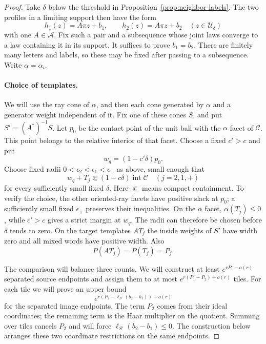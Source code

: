 \begin{proof}
Take $\delta$ below the threshold in Proposition~\ref{prop:neighbor-labels}.
The two profiles in a limiting support then have the form
\[
 h_1(z)=A\pi z+b_1,\qquad h_2(z)=A\pi z+b_2
 \quad(z\in\mathcal U_\delta)
\]
with one $A\in\mathcal A$.  Fix such a pair and a subsequence whose joint
laws converge to a law containing it in its support.  It suffices to prove
$b_1=b_2$.  There are finitely many letters and labels, so these may be
fixed after passing to a subsequence.  Write $\alpha=\alpha_i$.

\paragraph{Choice of templates.}
We will use the ray cone of $\alpha$, and then each cone generated by
$\alpha$ and a generator weight independent of it.  Fix one of these
cones $S$, and put $S'=(A^*)^{-1}S$.  Let $p_0$ be the contact point of the
unit ball with the $\alpha$ facet of $\mathcal C$.  This point belongs to
the relative interior of that facet.  Choose a fixed $c'>c$ and put
\[
 w_q=(1-c'\delta)p_0.
\]
Choose fixed radii $0<\epsilon_2<\epsilon_1<\epsilon_+$ as above, small
enough that
\begin{equation}
 w_q+T_j\Subset(1-c\delta)\operatorname{int}\mathcal C
 \quad(j=2,1,+)
 \label{eq:offset-template-interior}
\end{equation}
for every sufficiently small fixed $\delta$.  Here $\Subset$ means compact
containment.  To verify the choice, the other oriented-ray facets have
positive slack at $p_0$; a sufficiently small fixed $\epsilon_+$ preserves
their inequalities.  On the $\alpha$ facet, $\alpha(T_j)\le0$, while
$c'>c$ gives a strict margin at $w_q$.  The radii can therefore be chosen
before $\delta$ tends to zero.  On the target templates $AT_j$ the inside
weights of $S'$ have width zero and all mixed words have positive width.
Also
\[
 P(AT_j)=P(T_j)=P_j.
\]

The comparison will balance three counts.  We will construct at least
$e^{rP_1-o(r)}$ separated source endpoints and assign them to at most
$e^{r(P_1-P_2)+o(r)}$ tiles.  For each tile we will prove an upper
bound
\[
 e^{r(P_2-\ell_{S'}(b_2-b_1))+o(r)}
\]
for the separated image endpoints.  The term $P_2$ comes from their
ideal coordinates; the remaining term is the Haar multiplier on the
quotient.  Summing over tiles cancels $P_2$ and will force
$\ell_{S'}(b_2-b_1)\le0$.  The construction below arranges these two
coordinate restrictions on the same endpoints.


\end{proof}
